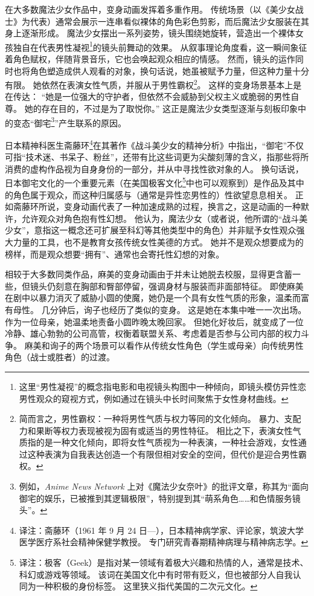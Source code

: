 在大多数魔法少女作品中，变身动画发挥着多重作用。
传统场景（以《美少女战士》为代表）通常会展示一连串看似裸体的角色彩色剪影，而后魔法少女服装在其身上逐渐形成。
魔法少女摆出一系列姿势，镜头围绕她旋转，营造出一个裸体女孩独自在代表男性凝视\footnote{%
    这里“男性凝视”的概念指电影和电视镜头构图中一种倾向，即镜头模仿异性恋男性观众的窥视方式，例如通过在镜头中长时间聚焦于女性身材曲线。
}的镜头\cite{orbaugh2003busty-battlin-babes,mulvey2006visual-pleasure}前舞动的效果。
从叙事理论角度看，这一瞬间象征着角色赋权，伴随背景音乐，它也会唤起观众相应的情感。
然而，镜头的运作同时也将角色塑造成供人观看的对象，换句话说，她虽被赋予力量，但这种力量十分有限。
她依然在表演女性气质，并服从于男性霸权\footnote{%
    简而言之，男性霸权：一种将男性气质与权力等同的文化倾向。
    暴力、支配力和果断等权力表现被视为固有或适当的男性特征。
    相比之下，表演女性气质指的是一种文化倾向，即将女性气质视为一种表演，一种社会游戏，女性通过这种表演为自我表达创造一个有限但相对安全的空间，但代价是迎合男性霸权。
}\cite{connell1987gender-power}。
这样的变身场景基本上是在传达：
“她是一位强大的守护者，但依然不会威胁到父权主义或脆弱的男性自尊。
她的存在目的，不过是为了取悦你。”
这正是魔法少女类型逐渐与刻板印象中的变态“御宅\footnote{%
    例如，\emph{Anime News Network} 上对《魔法少女奈叶》的批评文章，称其为“面向御宅的娱乐，已被推到其逻辑极限”，特别提到其“萌系角色……和色情服务镜头”。
}”产生联系的原因\cite{kimlinger2008nanoha-review}。

日本精神科医生斋藤环\footnote{%
    译注：斋藤环（1961 年 9 月 24 日—），日本精神病学家、评论家，筑波大学医学医疗系社会精神保健学教授。
    专门研究青春期精神病理与精神病志学。
}在其著作《战斗美少女的精神分析》中指出，“御宅”不仅可指“技术迷、书呆子、粉丝”，还带有比这些词更为尖酸刻薄的含义，指那些将所消费的虚构作品视为自身身份的一部分，并从中寻找性欲对象的人。
换句话说，日本御宅文化的一个重要元素（在美国极客文化\footnote{%
    译注：极客（Geek）是指对某一领域有着极大兴趣和热情的人，通常是技术、科幻或游戏等领域。
    该词在美国文化中有时带有贬义，但也被部分人自我认同为一种积极的身份标签。
    这里狭义指代美国的二次元文化。
}中也可以观察到）是作品及其中的角色属于观众，而这种归属感与（通常是异性恋男性的）性欲望息息相关。
正如斋藤环所说，变身动画代表了一种加速成熟的过程，换言之，这是动画的一种默许，允许观众对角色抱有性幻想。
他认为，魔法少女（或者说，他所谓的“战斗美少女”，意指这一概念还可扩展至科幻等其他类型中的角色）并非赋予女性观众强大力量的工具，也不是教育女孩传统女性美德的方式。
她并不是观众想要成为的榜样，而是观众想要“拥有”、通常也会寄托性幻想的对象\cite{saito2011beautiful-fighting-girl}。

相较于大多数同类作品，麻美的变身动画由于并未让她脱去校服，显得更含蓄一些，但镜头仍刻意在胸部和臀部停留，强调身材与服装而非面部特征。
即使麻美在剧中以暴力消灭了威胁小圆的使魔，她仍是一个具有女性气质的形象，温柔而富有母性。
几分钟后，询子也经历了类似的变身。
这是她在本集中唯一一次出场。
作为一位母亲，她温柔地责备小圆昨晚太晚回家。
但她化好妆后，就变成了一位冷静、雄心勃勃的公司高管，权衡着联盟关系、考虑着是否参与公司内部的权力斗争。
麻美和询子的两个场景可以看作从传统女性角色（学生或母亲）向传统男性角色（战士或胜者）的过渡。


